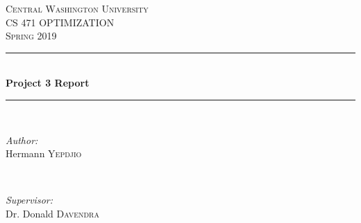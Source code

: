 \documentclass[12pt]{article}
\begin{document}
	
	\begin{titlepage}
		
		\newcommand{\HRule}{\rule{\linewidth}{0.5mm}} %
		
		\center %
		
		
		\textsc{\LARGE Central Washington University}\\[1.5cm] %
		\textsc{\Large CS 471 OPTIMIZATION}\\[0.5cm] %
		\textsc{\large Spring 2019}\\[0.5cm] %
		
		
		\HRule \\[0.4cm]
		{ \huge \bfseries Project 3 Report}\\[0.4cm] %
		\HRule \\[1.5cm]
		
		
		\begin{minipage}{0.4\textwidth}
			\begin{flushleft} \large
				\emph{Author:}\\
				Hermann \textsc{Yepdjio} %
			\end{flushleft}
		\end{minipage}
		~
		\begin{minipage}{0.4\textwidth}
			\begin{flushright} \large
				\emph{Supervisor:} \\
				Dr. Donald \textsc{Davendra} %
			\end{flushright}
		\end{minipage}\\[1cm]
		

\end{titlepage}
\end{document}
